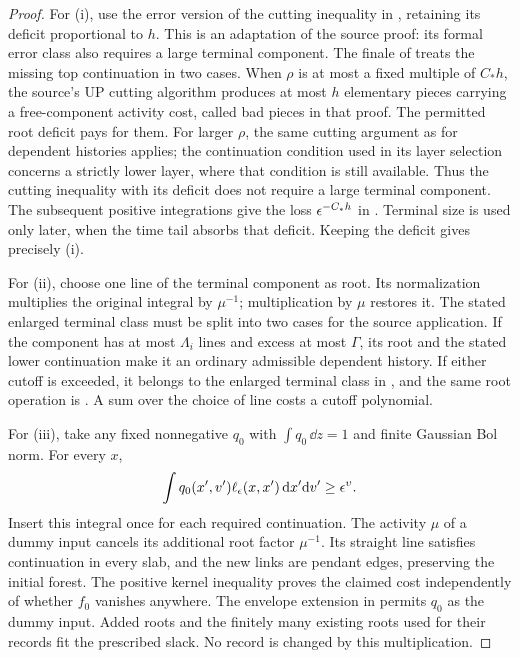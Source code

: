 \begin{proof}
For (i), use the error version of the cutting inequality in
\cite[Equation (9.51)]{DHM2025}, retaining its deficit proportional to
\(h\). This is an adaptation of the source proof: its formal error
class also requires a large terminal component. The finale of
\cite[Section 13.5, p.~169]{DHM2025} treats the missing top continuation
in two cases. When \(\rho\) is at most a fixed multiple of \(C_*h\),
the source's UP cutting algorithm produces at most \(h\) elementary
pieces carrying a free-component activity cost, called bad pieces in
that proof. The permitted root deficit pays for them. For larger
\(\rho\), the same cutting argument as for dependent histories applies;
the continuation condition used in its layer selection concerns a
strictly lower layer, where that condition is still available. Thus
the cutting inequality with its deficit does not require a large
terminal component. The subsequent positive integrations give the loss
\(\epsilon^{-C_*h}\) in \cite[Equation (9.82)]{DHM2025}. Terminal size is
used only later, when the time tail absorbs that deficit. Keeping the
deficit gives precisely (i).

For (ii), choose one line of the terminal component as root. Its
normalization multiplies the original integral by \(\mu^{-1}\);
multiplication by \(\mu\) restores it. The stated enlarged terminal
class must be split into two cases for the source application.
If the component has at most \(\Lambda_i\) lines and excess at most
\(\Gamma\), its root and the stated lower continuation make it an
ordinary admissible dependent history.  If either cutoff is exceeded,
it belongs to the enlarged terminal class in
\cite[Definition 3.20(4)]{DHM2025}, and the same root operation is
\cite[Equation (15.4)]{DHM2025}. A sum over the choice of line costs
a cutoff polynomial.

For (iii), take any fixed nonnegative \(q_0\) with
\(\int q_0\,\dd z=1\) and finite Gaussian Bol norm. For every \(x\),
\[
 \int q_0(x',v')\ell_\epsilon(x,x')\,\mathrm d x'\mathrm d v'
       \ge\epsilon^\upsilon.
\]
Insert this integral once for each required continuation. The activity
\(\mu\) of a dummy input cancels its additional root factor
\(\mu^{-1}\). Its straight line satisfies continuation in every slab,
and the new links are pendant edges, preserving the initial forest.
The positive kernel inequality proves the claimed cost independently
of whether \(f_0\) vanishes anywhere. The envelope extension in
 permits \(q_0\) as the dummy input. Added roots
and the finitely many existing roots used for their records fit the
prescribed slack. No record is changed by this multiplication.
\end{proof}
